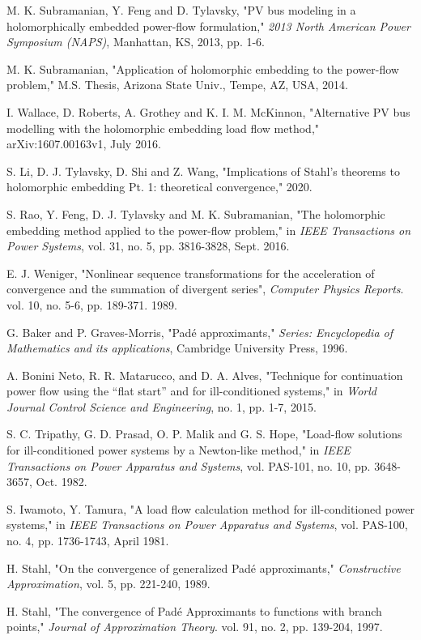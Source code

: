 \documentclass[journal]{IEEEtran}
\begin{document}
\begin{thebibliography}{22}
M. K. Subramanian, Y. Feng and D. Tylavsky, "PV bus modeling in a holomorphically embedded power-flow formulation," \emph{2013 North American Power Symposium (NAPS)}, Manhattan, KS, 2013, pp. 1-6.

M. K. Subramanian, "Application of holomorphic embedding to the power-flow problem," M.S. Thesis, Arizona State Univ., Tempe, AZ, USA, 2014.

I. Wallace, D. Roberts, A. Grothey and K. I. M. McKinnon, "Alternative PV bus modelling with the holomorphic embedding load flow method," arXiv:1607.00163v1, July 2016.

S. Li, D. J. Tylavsky, D. Shi and Z. Wang, "Implications of Stahl's theorems to holomorphic embedding Pt. 1: theoretical convergence," 2020.

S. Rao, Y. Feng, D. J. Tylavsky and M. K. Subramanian, "The holomorphic embedding method applied to the power-flow problem," in \emph{IEEE Transactions on Power Systems}, vol. 31, no. 5, pp. 3816-3828, Sept. 2016.

E. J. Weniger, "Nonlinear sequence transformations for the acceleration of convergence and the summation of divergent series", \emph{Computer Physics Reports}. vol. 10, no. 5-6, pp. 189-371. 1989.

G. Baker and P. Graves-Morris, "Padé approximants," \emph{Series: Encyclopedia of Mathematics and its applications}, Cambridge University Press, 1996.


A. Bonini Neto, R. R. Matarucco, and D. A. Alves, "Technique for continuation power flow using the “flat start” and for ill-conditioned systems," in \emph{World Journal Control Science and Engineering}, no. 1, pp. 1-7, 2015.



S. C. Tripathy, G. D. Prasad, O. P. Malik and G. S. Hope, "Load-flow solutions for ill-conditioned power systems by a Newton-like method," in \emph{IEEE Transactions on Power Apparatus and Systems}, vol. PAS-101, no. 10, pp. 3648-3657, Oct. 1982.

\newpage

S. Iwamoto, Y. Tamura, "A load flow calculation method for ill-conditioned power systems," in \emph{IEEE Transactions on Power Apparatus and Systems}, vol. PAS-100, no. 4, pp. 1736-1743, April 1981.

H. Stahl, "On the convergence of generalized Padé approximants," \emph{Constructive Approximation}, vol. 5, pp. 221-240, 1989.

H. Stahl, "The convergence of Padé Approximants to functions with branch points," \emph{Journal of Approximation Theory}. vol. 91, no. 2, pp. 139-204, 1997.

\end{thebibliography}
\end{document}
